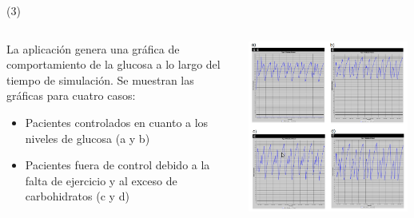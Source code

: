 \begin{frame}{ (3) } 
\begin{columns}
\begin{column}{0.65\textwidth}
La aplicación genera una gráfica de comportamiento de la glucosa a lo largo del tiempo de simulación. Se muestran las gráficas para cuatro casos:
	\begin{itemize}
\item Pacientes controlados en cuanto a los niveles de glucosa (a y b)
\item Pacientes fuera de control debido a la falta de ejercicio y al exceso de carbohidratos (c y d)
	\end{itemize}
\end{column}
\begin{column}{0.35\textwidth}
\begin{center}
     \includegraphics[width=0.99\textwidth]{Figs/Diabetes5}
     \end{center}
\end{column}
\end{columns}
\end{frame}



